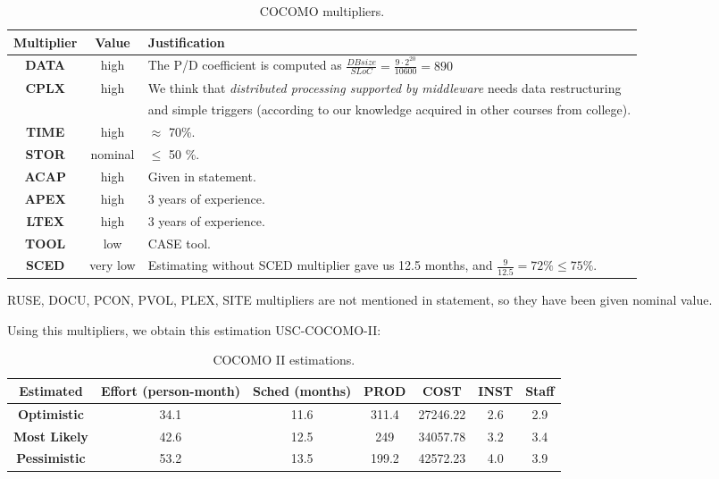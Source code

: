 \begin{table}[hbtp]
\centering
\begin{tabular}{|c|c|p{10cm}|}
\hline
\textbf{Multiplier} & \textbf{Value} & \textbf{Justification} \\ \hline
\textbf{DATA} & high & The P/D coefficient is computed as $\frac{DB size}{SLoC} = \frac{9 · 2^{20}}{10600} = 890$ \vspace{3pt} \\ \hline
\textbf{CPLX} & high & We think that \textit{distributed processing supported by middleware} needs data restructuring\\ & & and simple triggers (according to our knowledge acquired in other courses from college). \\ \hline
\textbf{TIME} & high & $\approx$ 70\%.  \\ \hline
\textbf{STOR} & nominal & $\leq$ 50 \%. \\ \hline
\textbf{ACAP} & high & Given in statement. \\ \hline
\textbf{APEX} & high & 3 years of experience. \\ \hline
\textbf{LTEX} & high & 3 years of experience. \\ \hline
\textbf{TOOL} & low & CASE tool. \\ \hline
\textbf{SCED} & very low & Estimating without SCED multiplier gave us 12.5 months, and $\frac{9}{12.5}=72\% \leq 75\%$. \\\hline
\end{tabular}
\caption{COCOMO multipliers.}
\label{tblMultipliersProblem2}
\end{table}

RUSE, DOCU, PCON, PVOL, PLEX, SITE multipliers are not mentioned in statement, so they have been given nominal value.


Using this multipliers, we obtain this estimation USC-COCOMO-II:

\begin{table}[hbtp]
\centering
\begin{tabular}{|c||c|c|c|c|c|c|}
\hline
\textbf{Estimated} & \textbf{Effort (person-month)} & \textbf{Sched (months)} & \textbf{PROD} & \textbf{COST} & \textbf{INST} & \textbf{Staff} \\ \hline
\textbf{Optimistic} & 34.1 & 11.6 & 311.4 & 27246.22 & 2.6 & 2.9 \\
\textbf{Most Likely} & 42.6& 12.5 & 249 & 34057.78 & 3.2 & 3.4 \\
\textbf{Pessimistic} & 53.2 & 13.5 &199.2 & 42572.23 & 4.0 & 3.9\\ \hline
\end{tabular}
\label{tbl_Problem2}
\caption{COCOMO II estimations.}
\end{table}

